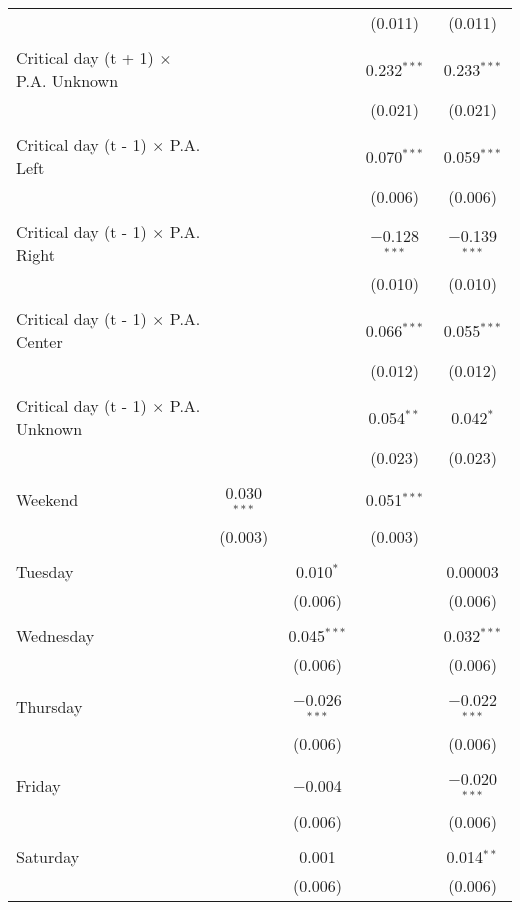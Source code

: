 \documentclass[
]{article}
\begin{document}
\begin{table}[!htbp]
{\begin{tabular}{@{\extracolsep{5pt}}lcccc}
  &  &  & (0.011) & (0.011) \\ 
  & & & & \\ 
 Critical day (t + 1) $\times$ P.A. Unknown &  &  & 0.232$^{***}$ & 0.233$^{***}$ \\ 
  &  &  & (0.021) & (0.021) \\ 
  & & & & \\ 
 Critical day (t - 1) $\times$ P.A. Left &  &  & 0.070$^{***}$ & 0.059$^{***}$ \\ 
  &  &  & (0.006) & (0.006) \\ 
  & & & & \\ 
 Critical day (t - 1) $\times$ P.A. Right &  &  & $-$0.128$^{***}$ & $-$0.139$^{***}$ \\ 
  &  &  & (0.010) & (0.010) \\ 
  & & & & \\ 
 Critical day (t - 1) $\times$ P.A. Center &  &  & 0.066$^{***}$ & 0.055$^{***}$ \\ 
  &  &  & (0.012) & (0.012) \\ 
  & & & & \\ 
 Critical day (t - 1) $\times$ P.A. Unknown &  &  & 0.054$^{**}$ & 0.042$^{*}$ \\ 
  &  &  & (0.023) & (0.023) \\ 
  & & & & \\ 
 Weekend & 0.030$^{***}$ &  & 0.051$^{***}$ &  \\ 
  & (0.003) &  & (0.003) &  \\ 
  & & & & \\ 
 Tuesday &  & 0.010$^{*}$ &  & 0.00003 \\ 
  &  & (0.006) &  & (0.006) \\ 
  & & & & \\ 
 Wednesday &  & 0.045$^{***}$ &  & 0.032$^{***}$ \\ 
  &  & (0.006) &  & (0.006) \\ 
  & & & & \\ 
 Thursday &  & $-$0.026$^{***}$ &  & $-$0.022$^{***}$ \\ 
  &  & (0.006) &  & (0.006) \\ 
  & & & & \\ 
 Friday &  & $-$0.004 &  & $-$0.020$^{***}$ \\ 
  &  & (0.006) &  & (0.006) \\ 
  & & & & \\ 
 Saturday &  & 0.001 &  & 0.014$^{**}$ \\ 
  &  & (0.006) &  & (0.006) \\ 

\end{tabular}}
\end{table}
\end{document}
